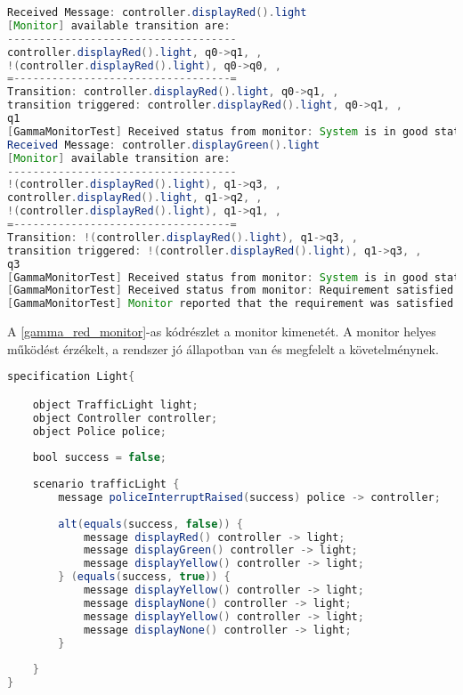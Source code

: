 \begin{lstlisting}[language=java, frame=single, float=ht!, caption={Monitor kimenete.},captionpos=b,label=gamma_red_monitor]
Received Message: controller.displayRed().light
[Monitor] available transition are: 
------------------------------------
controller.displayRed().light, q0->q1, , 
!(controller.displayRed().light), q0->q0, , 
=----------------------------------=
Transition: controller.displayRed().light, q0->q1, , 
transition triggered: controller.displayRed().light, q0->q1, , 
q1
[GammaMonitorTest] Received status from monitor: System is in good state.
Received Message: controller.displayGreen().light
[Monitor] available transition are: 
------------------------------------
!(controller.displayRed().light), q1->q3, , 
controller.displayRed().light, q1->q2, , 
!(controller.displayRed().light), q1->q1, , 
=----------------------------------=
Transition: !(controller.displayRed().light), q1->q3, , 
transition triggered: !(controller.displayRed().light), q1->q3, , 
q3
[GammaMonitorTest] Received status from monitor: System is in good state.
[GammaMonitorTest] Received status from monitor: Requirement satisfied
[GammaMonitorTest] Monitor reported that the requirement was satisfied
\end{lstlisting}

A \ref{gamma_red_monitor}-as kódrészlet a monitor kimenetét.
A monitor helyes működést érzékelt, a rendszer jó állapotban van és megfelelt a követelménynek.

\begin{lstlisting}[language=java, frame=single, float=ht!, caption={Szenárió szöveges leírása.},captionpos=b,label=gamma_complex_scenario]
specification Light{

    object TrafficLight light;
    object Controller controller;
    object Police police;
    
    bool success = false;
    
    scenario trafficLight {
        message policeInterruptRaised(success) police -> controller;
        
        alt(equals(success, false)) {
            message displayRed() controller -> light;
            message displayGreen() controller -> light;
            message displayYellow() controller -> light;
        } (equals(success, true)) {
            message displayYellow() controller -> light;
            message displayNone() controller -> light;
            message displayYellow() controller -> light;
            message displayNone() controller -> light;
        }
        
    }
}
\end{lstlisting}

